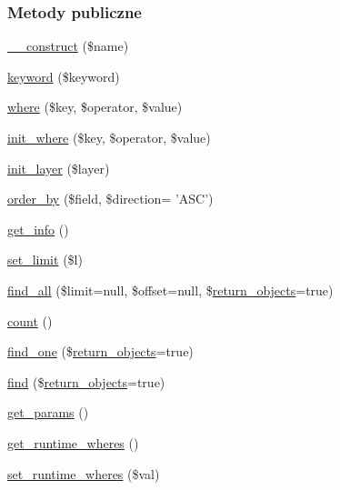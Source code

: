 \subsubsection*{Metody publiczne}
\begin{DoxyCompactItemize}
\item 
\hyperlink{classep___dataset_a4717bbfc70a40a57ee741ed70766c309}{\-\_\-\-\_\-construct} (\$name)
\item 
\hyperlink{classep___dataset_aa3ade294e9edd356f3a8584ec43658e7}{keyword} (\$keyword)
\item 
\hyperlink{classep___dataset_aa850d279b606c6c1e77d3bb71e6bd65b}{where} (\$key, \$operator, \$value)
\item 
\hyperlink{classep___dataset_a321109a87bb59bf0ec5700ef6a57cfe4}{init\-\_\-where} (\$key, \$operator, \$value)
\item 
\hyperlink{classep___dataset_af555192d4cf0a6efaf743e6b75b01ecd}{init\-\_\-layer} (\$layer)
\item 
\hyperlink{classep___dataset_aa2b8f6406b39305ce49f2f4e33ce490f}{order\-\_\-by} (\$field, \$direction= 'A\-S\-C')
\item 
\hyperlink{classep___dataset_a5815135ec6285b6f6e609d1848cfdc83}{get\-\_\-info} ()
\item 
\hyperlink{classep___dataset_ad4b11e8b3fa1f694d0c0de60a231aa94}{set\-\_\-limit} (\$l)
\item 
\hyperlink{classep___dataset_a16871786b17450d6c2d67ea1d31fc819}{find\-\_\-all} (\$limit=null, \$offset=null, \$\hyperlink{classep___dataset_a6e59d0e2fae50446d13d19e34bdeb49e}{return\-\_\-objects}=true)
\item 
\hyperlink{classep___dataset_ac751e87b3d4c4bf2feb03bee8b092755}{count} ()
\item 
\hyperlink{classep___dataset_a552afadc57ae009e433613a4f905fa93}{find\-\_\-one} (\$\hyperlink{classep___dataset_a6e59d0e2fae50446d13d19e34bdeb49e}{return\-\_\-objects}=true)
\item 
\hyperlink{classep___dataset_a72170a484e70f91313f55ad95a120308}{find} (\$\hyperlink{classep___dataset_a6e59d0e2fae50446d13d19e34bdeb49e}{return\-\_\-objects}=true)
\item 
\hyperlink{classep___dataset_a94cd7e6181ac47fa879dfd6cd4323ef5}{get\-\_\-params} ()
\item 
\hyperlink{classep___dataset_a09c1fa208c116445649af36f41259a1f}{get\-\_\-runtime\-\_\-wheres} ()
\item 
\hyperlink{classep___dataset_a3cbb752297aa6f783417ce6ecda1e50b}{set\-\_\-runtime\-\_\-wheres} (\$val)

\end{DoxyCompactItemize}
